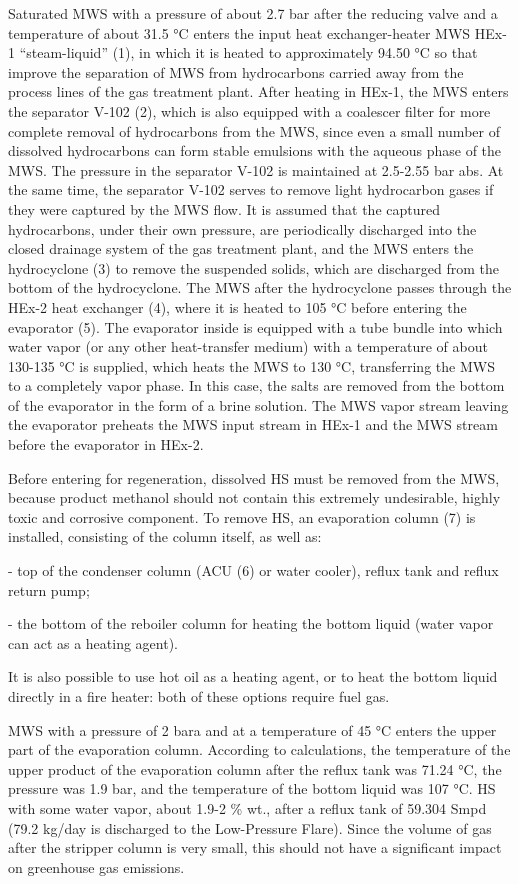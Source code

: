 Saturated MWS with a pressure of about 2.7 bar after the reducing valve
and a temperature of about 31.5 °C enters the input heat
exchanger-heater MWS HEx-1 ``steam-liquid'' (1), in which it is heated
to approximately 94.50 °C so that improve the separation of MWS from
hydrocarbons carried away from the process lines of the gas treatment
plant. After heating in HEx-1, the MWS enters the separator V-102 (2),
which is also equipped with a coalescer filter for more complete removal
of hydrocarbons from the MWS, since even a small number of dissolved
hydrocarbons can form stable emulsions with the aqueous phase of the
MWS. The pressure in the separator V-102 is maintained at 2.5-2.55 bar
abs. At the same time, the separator V-102 serves to remove light
hydrocarbon gases if they were captured by the MWS flow. It is assumed
that the captured hydrocarbons, under their own pressure, are
periodically discharged into the closed drainage system of the gas
treatment plant, and the MWS enters the hydrocyclone (3) to remove the
suspended solids, which are discharged from the bottom of the
hydrocyclone. The MWS after the hydrocyclone passes through the HEx-2
heat exchanger (4), where it is heated to 105 °C before entering the
evaporator (5). The evaporator inside is equipped with a tube bundle
into which water vapor (or any other heat-transfer medium) with a
temperature of about 130-135 °C is supplied, which heats the MWS to 130
°C, transferring the MWS to a completely vapor phase. In this case, the
salts are removed from the bottom of the evaporator in the form of a
brine solution. The MWS vapor stream leaving the evaporator preheats the
MWS input stream in HEx-1 and the MWS stream before the evaporator in
HEx-2.

Before entering for regeneration, dissolved HS must be
removed from the MWS, because product methanol should not contain this
extremely undesirable, highly toxic and corrosive component. To remove
HS, an evaporation column (7) is installed, consisting
of the column itself, as well as:

- top of the condenser column (ACU (6) or water cooler), reflux tank and
reflux return pump;

- the bottom of the reboiler column for heating the bottom liquid (water
vapor can act as a heating agent).

It is also possible to use hot oil as a heating agent, or to heat the
bottom liquid directly in a fire heater: both of these options require
fuel gas.

MWS with a pressure of 2 bara and at a temperature of 45 °C enters the
upper part of the evaporation column. According to calculations, the
temperature of the upper product of the evaporation column after the
reflux tank was 71.24 °C, the pressure was 1.9 bar, and the temperature
of the bottom liquid was 107 °C. HS with some water
vapor, about 1.9-2 \% wt., after a reflux tank of 59.304
Smpd (79.2 kg/day is discharged to the Low-Pressure
Flare). Since the volume of gas after the stripper column is very small,
this should not have a significant impact on greenhouse gas emissions.

